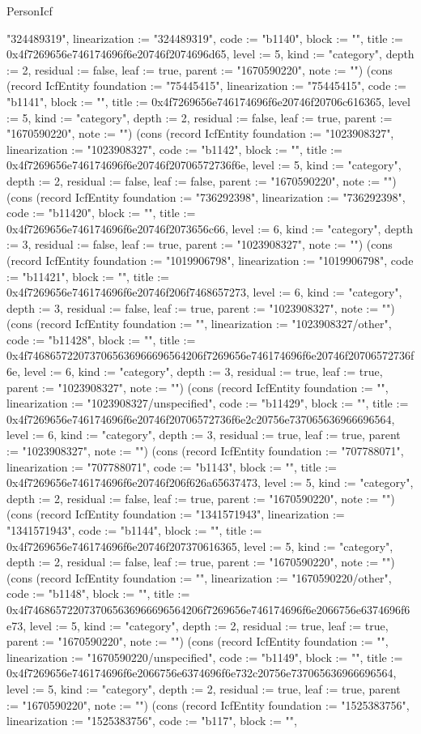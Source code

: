 \begin{lexlean}{PersonIcf}
\begin{semanticmodule}
{"324489319", linearization := "324489319", code := "b1140", block := "", title := 0x4f7269656e746174696f6e20746f2074696d65, level := 5, kind := "category", depth := 2, residual := false, leaf := true, parent := "1670590220", note := ""}) (cons (record IcfEntity {foundation := "75445415", linearization := "75445415", code := "b1141", block := "", title := 0x4f7269656e746174696f6e20746f20706c616365, level := 5, kind := "category", depth := 2, residual := false, leaf := true, parent := "1670590220", note := ""}) (cons (record IcfEntity {foundation := "1023908327", linearization := "1023908327", code := "b1142", block := "", title := 0x4f7269656e746174696f6e20746f20706572736f6e, level := 5, kind := "category", depth := 2, residual := false, leaf := false, parent := "1670590220", note := ""}) (cons (record IcfEntity {foundation := "736292398", linearization := "736292398", code := "b11420", block := "", title := 0x4f7269656e746174696f6e20746f2073656c66, level := 6, kind := "category", depth := 3, residual := false, leaf := true, parent := "1023908327", note := ""}) (cons (record IcfEntity {foundation := "1019906798", linearization := "1019906798", code := "b11421", block := "", title := 0x4f7269656e746174696f6e20746f206f7468657273, level := 6, kind := "category", depth := 3, residual := false, leaf := true, parent := "1023908327", note := ""}) (cons (record IcfEntity {foundation := "", linearization := "1023908327/other", code := "b11428", block := "", title := 0x4f7468657220737065636966696564206f7269656e746174696f6e20746f20706572736f6e, level := 6, kind := "category", depth := 3, residual := true, leaf := true, parent := "1023908327", note := ""}) (cons (record IcfEntity {foundation := "", linearization := "1023908327/unspecified", code := "b11429", block := "", title := 0x4f7269656e746174696f6e20746f20706572736f6e2c20756e737065636966696564, level := 6, kind := "category", depth := 3, residual := true, leaf := true, parent := "1023908327", note := ""}) (cons (record IcfEntity {foundation := "707788071", linearization := "707788071", code := "b1143", block := "", title := 0x4f7269656e746174696f6e20746f206f626a65637473, level := 5, kind := "category", depth := 2, residual := false, leaf := true, parent := "1670590220", note := ""}) (cons (record IcfEntity {foundation := "1341571943", linearization := "1341571943", code := "b1144", block := "", title := 0x4f7269656e746174696f6e20746f207370616365, level := 5, kind := "category", depth := 2, residual := false, leaf := true, parent := "1670590220", note := ""}) (cons (record IcfEntity {foundation := "", linearization := "1670590220/other", code := "b1148", block := "", title := 0x4f7468657220737065636966696564206f7269656e746174696f6e2066756e6374696f6e73, level := 5, kind := "category", depth := 2, residual := true, leaf := true, parent := "1670590220", note := ""}) (cons (record IcfEntity {foundation := "", linearization := "1670590220/unspecified", code := "b1149", block := "", title := 0x4f7269656e746174696f6e2066756e6374696f6e732c20756e737065636966696564, level := 5, kind := "category", depth := 2, residual := true, leaf := true, parent := "1670590220", note := ""}) (cons (record IcfEntity {foundation := "1525383756", linearization := "1525383756", code := "b117", block := "", }
\end{semanticmodule}
\end{lexlean}
